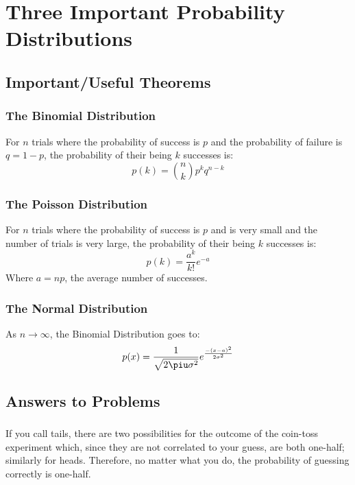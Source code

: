 
\chapter{Three Important Probability Distributions}

\section{Important/Useful Theorems}

\subsection{The Binomial Distribution}
For $n$ trials where the probability of success is $p$ and the probability of failure is $q=1-p$, the probability of their being $k$ successes is:
\begin{equation}
	p(k) = \binom{n}{k} p^k q^{n-k}
\end{equation}

\subsection{The Poisson Distribution}
For $n$ trials where the probability of success is $p$ and is very small and the number of trials is very large, the probability of their being $k$ successes is:
\begin{equation}
	p(k) = \frac{a^k}{k!}e^{-a}
\end{equation}
Where $a=np$, the average number of successes.

\subsection{The Normal Distribution}
As $n \rightarrow \infty$, the Binomial Distribution goes to:
\begin{equation}
	p(x) = \frac{1}{\sqrt{2 \piu \sigma^2}}e^{\frac{-(x-a)^2}{2 \sigma^2}}
\end{equation}


\section{Answers to Problems}


\subsection{}
If you call tails, there are two possibilities for the outcome of the coin-toss experiment which, since they are not correlated to your guess, are both one-half; similarly for heads.  Therefore, no matter what you do, the probability of guessing correctly is one-half.

